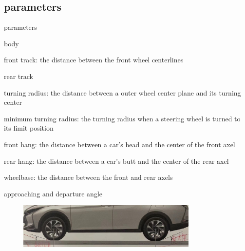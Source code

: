 \subsection{parameters}
\begin{frame}{parameters}
	\begin{block}{body}
		\begin{compactitem}
			\item front track: the distance between the front wheel centerlines
			\item rear track
			\item turning radius: the distance between a outer wheel center plane and its turning center
			\item minimum turning radius: the turning radius when a steering wheel is turned to its limit position
			\item front hang: the distance between a car's head and the center of the front axel
			\item rear hang: the distance between a car's butt and the center of the rear axel
			\item wheelbase: the distance between the front and rear axels
		\end{compactitem}
	\end{block}
\end{frame}
\begin{frame}
	\begin{block}{}
		\begin{compactitem}
			\item approaching and departure angle
			\begin{figure}[htbp]
				\centering
				\includegraphics[width=0.8\textwidth]{1-3}
			\end{figure}
		\end{compactitem}
	\end{block}
\end{frame}
